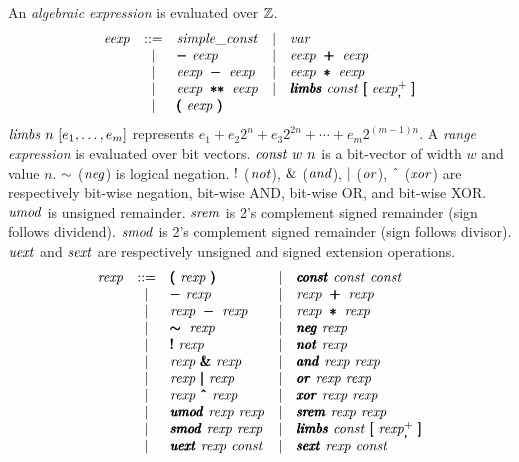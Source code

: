 \documentclass{article}
\begin{document}
An \emph{algebraic expression} is evaluated over $\mathbb{Z}$.
\[
\begin{array}{rclcl}
\eexp &  ::= & \simpleconst %
      & \mid & \var \\
      & \mid & \pmb{-}\ \eexp %
      & \mid & \eexp\ \pmb{+}\ \eexp \\
      & \mid & \eexp\ \pmb{-}\ \eexp %
      & \mid & \eexp\ \pmb{*}\ \eexp \\
      & \mid & \eexp\ \pmb{**}\ \eexp %
      & \mid & \pmb\ilimbs\ \const\ \pmb{[}\ \eexp_{\pmb,}^+\ \pmb{]} \\
      & \mid & \pmb{(}\ \eexp\ \pmb{)}
\end{array}
\]
$\mathit{limbs}\ n\ [e_1, \ldots, e_m ]$ represents $e_1 + e_2 2^n + e_3
2^{2n} + \cdots + e_m 2^{(m-1)n}$.
A \emph{range expression} is evaluated over bit vectors.
$\mathit{const}\ w\ n$ is a bit-vector of width $w$ and value $n$.
$\sim$ ($\mathit{neg}$) is logical negation.
$!$ ($\mathit{not}$), $\mathit{\&}$ ($\mathit{and}$), $\mathit{|}$ ($\mathit{or}$), $\xorop$ ($\mathit{xor}$) are respectively bit-wise
negation, bit-wise AND, bit-wise OR, and bit-wise XOR.
$\mathit{umod}$ is unsigned remainder.
$\mathit{srem}$ is 2's complement signed remainder (sign follows dividend).
$\mathit{smod}$ is 2's complement signed remainder (sign follows divisor).
$\mathit{uext}$ and $\mathit{sext}$ are respectively unsigned and signed extension
operations.
\[
\begin{array}{rclcl}
  \rexp &  ::= & \pmb{(}\ \rexp\ \pmb{)}
  & \mid & \pmb\iconst\ \const\ \const \\
        & \mid & \pmb{-}\ \rexp
  & \mid & \rexp\ \pmb\addop\ \rexp \\
        & \mid & \rexp\ \pmb\subop\ \rexp
  & \mid & \rexp\ \pmb\mulop\ \rexp \\
        & \mid & \pmb\negop\ \rexp
  & \mid & \pmb\ineg\ \rexp \\
        & \mid & \pmb\notop\ \rexp
  & \mid & \pmb\inot\ \rexp \\
        & \mid & \rexp\ \pmb\andop\ \rexp
  & \mid & \pmb\iand\ \rexp\ \rexp \\
        & \mid & \rexp\ \pmb\orop\ \rexp
  & \mid & \pmb\ior\ \rexp\ \rexp \\
        & \mid & \rexp\ \pmb\xorop\ \rexp
  & \mid & \pmb\ixor\ \rexp\ \rexp \\
        & \mid & \pmb\iumod\ \rexp\ \rexp
  & \mid & \pmb\isrem\ \rexp\ \rexp \\
        & \mid & \pmb\ismod\ \rexp\ \rexp
  & \mid & \pmb\ilimbs\ \const\ \pmb[\ \rexp_{\pmb,}^+\ \pmb] \\
        & \mid & \pmb\iuext\ \rexp\ \const
  & \mid & \pmb\isext\ \rexp\ \const \\
\end{array}
\]
\end{document}
